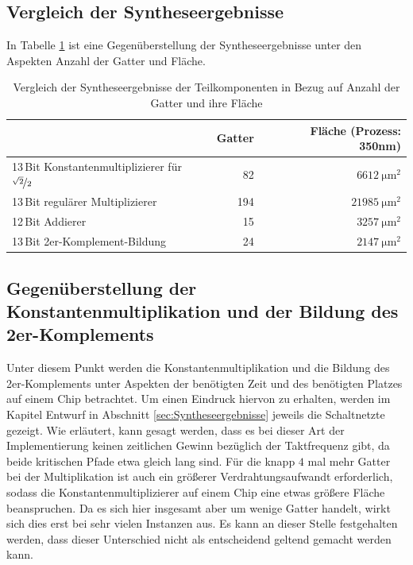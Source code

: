 \subsection{Vergleich der Syntheseergebnisse}
 In Tabelle \ref{tab:VergleichSyntheseergebnisse} ist eine Gegenüberstellung der Syntheseergebnisse unter den Aspekten Anzahl der Gatter und Fläche.
\begin{table}[!ht]
\centering
 \caption{Vergleich der Syntheseergebnisse der Teilkomponenten in Bezug auf Anzahl der Gatter und ihre Fläche}
 \label{tab:VergleichSyntheseergebnisse}
 \begin{tabular}{lrr}
 \hline
				&Gatter  	&Fläche (Prozess: 350nm) \\
  \hline	
  13\,Bit Konstantenmultiplizierer für $\nicefrac{\sqrt{2}}{2}$	& 82		& $\SI{6612}{\um^2}$ \\
  13\,Bit regulärer Multiplizierer				& 194		& $\SI{21985}{\um^2}$\\
  12\,Bit Addierer						& 15		& $\SI{3257}{\um^2}$\\
  13\,Bit 2er-Komplement-Bildung				& 24		& $\SI{2147}{\um^2}$\\
  \hline
 \end{tabular}
\end{table}



\subsection{Gegenüberstellung der Konstantenmultiplikation und der Bildung des 2er-Komplements}

Unter diesem Punkt werden die Konstantenmultiplikation und die Bildung des 2er-Komplements unter Aspekten der benötigten Zeit und des benötigten Platzes auf einem Chip 
betrachtet. Um einen Eindruck hiervon zu erhalten, werden im Kapitel Entwurf in Abschnitt \ref{sec:Syntheseergebnisse} jeweils die Schaltnetzte 
gezeigt.
Wie erläutert, kann gesagt werden, dass es bei dieser Art der Implementierung keinen zeitlichen Gewinn bezüglich der Taktfrequenz gibt, da beide kritischen Pfade etwa gleich lang 
sind. Für die knapp $4$ mal mehr Gatter bei der Multiplikation ist auch ein größerer Verdrahtungsaufwandt erforderlich, sodass die Konstantenmultiplizierer
auf einem Chip eine etwas größere Fläche beanspruchen. Da es sich hier insgesamt aber um wenige Gatter handelt, wirkt sich dies erst bei sehr vielen Instanzen aus.
Es kann an dieser Stelle festgehalten werden, dass dieser Unterschied nicht als entscheidend geltend gemacht werden kann.



